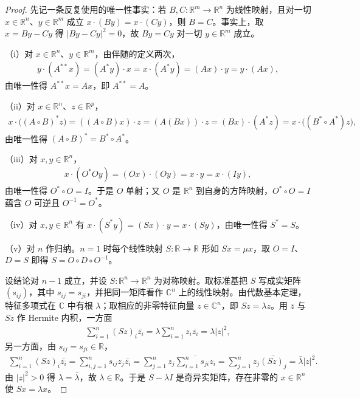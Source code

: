 \documentclass[../../main.tex]{subfiles}%
\begin{document}
\begin{proof}
先记一条反复使用的唯一性事实：若 $B,C:\mathbb{R}^m\to\mathbb{R}^n$ 为线性映射，且对一切 $x\in\mathbb{R}^n$、$y\in\mathbb{R}^m$ 成立 $x\cdot(By)=x\cdot(Cy)$，则 $B=C$。事实上，取 $x=By-Cy$ 得 $\lvert By-Cy\rvert^2=0$，故 $By=Cy$ 对一切 $y\in\mathbb{R}^m$ 成立。

（i）对 $x\in\mathbb{R}^n$、$y\in\mathbb{R}^m$，由伴随的定义两次，
\begin{align*}
y\cdot(A^{**}x)=(A^*y)\cdot x=x\cdot(A^*y)=(Ax)\cdot y=y\cdot(Ax),
\end{align*}
由唯一性得 $A^{**}x=Ax$，即 $A^{**}=A$。

（ii）对 $x\in\mathbb{R}^n$、$z\in\mathbb{R}^p$，
\begin{align*}
x\cdot\bigl((A\circ B)^*z\bigr)=((A\circ B)x)\cdot z=(A(Bx))\cdot z=(Bx)\cdot(A^*z)=x\cdot\bigl((B^*\circ A^*)z\bigr),
\end{align*}
由唯一性得 $(A\circ B)^*=B^*\circ A^*$。

（iii）对 $x,y\in\mathbb{R}^n$，
\begin{align*}
x\cdot(O^*Oy)=(Ox)\cdot(Oy)=x\cdot y=x\cdot(Iy),
\end{align*}
由唯一性得 $O^*\circ O=I$。于是 $O$ 单射；又 $O$ 是 $\mathbb{R}^n$ 到自身的方阵映射，$O^*\circ O=I$ 蕴含 $O$ 可逆且 $O^{-1}=O^*$。

（iv）对 $x,y\in\mathbb{R}^n$ 有 $x\cdot(S^*y)=(Sx)\cdot y=x\cdot(Sy)$，由唯一性得 $S^*=S$。

（v）对 $n$ 作归纳。$n=1$ 时每个线性映射 $S:\mathbb{R}\to\mathbb{R}$ 形如 $Sx=\mu x$，取 $O=I$、$D=S$ 即得 $S=O\circ D\circ O^{-1}$。

设结论对 $n-1$ 成立，并设 $S:\mathbb{R}^n\to\mathbb{R}^n$ 为对称映射。取标准基把 $S$ 写成实矩阵 $(s_{ij})$，其中 $s_{ij}=s_{ji}$，并把同一矩阵看作 $\mathbb{C}^n$ 上的线性映射。由代数基本定理，特征多项式在 $\mathbb{C}$ 中有根 $\lambda$；取相应的非零特征向量 $z\in\mathbb{C}^n$，即 $Sz=\lambda z$。用 $\bar z$ 与 $Sz$ 作 Hermite 内积，一方面
\begin{align*}
\sum_{i=1}^n(Sz)_i\overline{z_i}=\lambda\sum_{i=1}^nz_i\overline{z_i}=\lambda\lvert z\rvert^2,
\end{align*}
另一方面，由 $s_{ij}=s_{ji}\in\mathbb{R}$，
\begin{align*}
\sum_{i=1}^n(Sz)_i\overline{z_i}
=\sum_{i,j=1}^ns_{ij}z_j\overline{z_i}
=\sum_{j=1}^nz_j\overline{\sum_{i=1}^ns_{ji}z_i}
=\sum_{j=1}^nz_j\overline{(Sz)_j}
=\bar\lambda\lvert z\rvert^2.
\end{align*}
由 $\lvert z\rvert^2>0$ 得 $\lambda=\bar\lambda$，故 $\lambda\in\mathbb{R}$。于是 $S-\lambda I$ 是奇异实矩阵，存在非零的 $x\in\mathbb{R}^n$ 使 $Sx=\lambda x$。


\end{proof}
\end{document}
